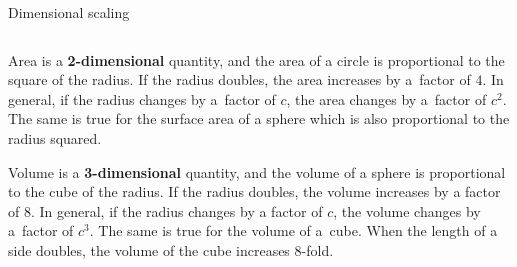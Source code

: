 \documentclass[9pt,aspectratio=169]{beamer}
\begin{document}
\begin{frame}{Dimensional scaling}
\begin{columns}[T]
\begin{column}{0.5\textwidth}
      Area is a \textbf{2-dimensional} quantity, and the area of a circle is proportional to the square of the radius.  If the radius doubles, the area increases by a~factor of $4$.  In general,  if the radius changes by a~factor of $c$, the area changes by a~factor of $c^2$.  The same is true for the surface area of a sphere which is also proportional to the radius squared.\medskip

      Volume is a \textbf{3-dimensional} quantity, and the volume of a sphere is proportional to the cube of the radius.  If the radius doubles, the volume increases by a factor of $8$.  In general, if the radius changes by a factor of $c$, the volume changes by a~factor of $c^3$.  The same is true for the volume of a~cube.  When the length of a side doubles, the volume of the cube increases $8$-fold.
    \end{column}
  \end{columns}
\end{frame}
\end{document}
